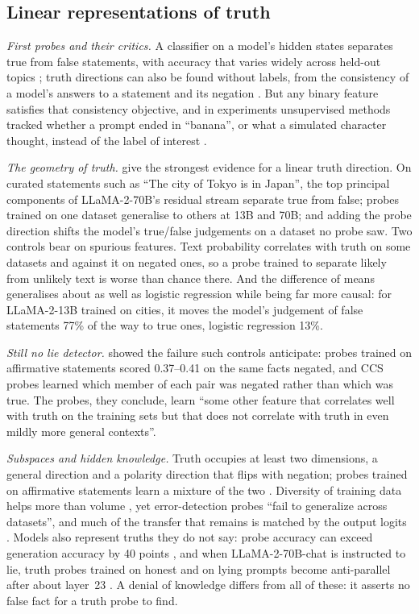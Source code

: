 \subsection{Linear representations of truth}
\label{sec:review-truth}

\emph{First probes and their critics.} A classifier on a model's hidden states separates true from
false statements, with accuracy that varies widely across held-out topics \cite{azaria2023internal};
truth directions can also be found without labels, from the consistency of a model's answers to a
statement and its negation \cite{burns2023discovering}. But any binary feature satisfies that
consistency objective, and in experiments unsupervised methods tracked whether a prompt ended in
``banana'', or what a simulated character thought, instead of the label of interest
\cite{farquhar2023challenges}.

\emph{The geometry of truth.} \textcite{marks2023geometry} give the strongest evidence for a linear
truth direction. On curated statements such as ``The city of Tokyo is in Japan'', the top principal
components of LLaMA-2-70B's residual stream separate true from false; probes trained on one dataset
generalise to others at 13B and 70B; and adding the probe direction shifts the model's true/false
judgements on a dataset no probe saw. Two controls bear on spurious features. Text probability
correlates with truth on some datasets and against it on negated ones, so a probe trained to separate
likely from unlikely text is worse than chance there. And the difference of means generalises about as
well as logistic regression while being far more causal: for LLaMA-2-13B trained on cities, it moves
the model's judgement of false statements 77\% of the way to true ones, logistic regression 13\%.

\emph{Still no lie detector.} \textcite{levinstein2025still} showed the failure such controls
anticipate: probes trained on affirmative statements scored 0.37--0.41 on the same facts negated, and
CCS probes learned which member of each pair was negated rather than which was true. The probes, they
conclude, learn ``some other feature that correlates well with truth on the training sets but that does
not correlate with truth in even mildly more general contexts''.

\emph{Subspaces and hidden knowledge.} Truth occupies at least two dimensions, a general direction and
a polarity direction that flips with negation; probes trained on affirmative statements learn a
mixture of the two \cite{buerger2024truth}. Diversity of training data helps more than volume
\cite{liu2024universal}, yet error-detection probes ``fail to generalize across datasets'', and much of
the transfer that remains is matched by the output logits \cite{orgad2025llms}. Models also represent
truths they do not say: probe accuracy can exceed generation accuracy by 40 points
\cite{li2023inference}, and when LLaMA-2-70B-chat is instructed to lie, truth probes trained on
honest and on lying prompts become anti-parallel after about layer~23 \cite{campbell2023localizing}. A
denial of knowledge differs from all of these: it asserts no false fact for a truth probe to find.


